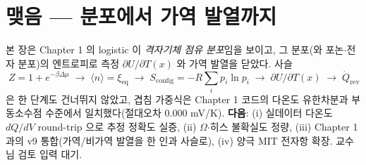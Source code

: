 \documentclass[11pt,a4paper]{article}
\newcommand{\eq}{\mathrm{eq}}
\newcommand{\rev}{\mathrm{rev}}
\newcommand{\cfg}{\mathrm{config}}
\newcommand{\avg}[1]{\langle #1\rangle}
\begin{document}
\section*{맺음 — 분포에서 가역 발열까지}
본 장은 Chapter 1 의 logistic 이 \emph{격자기체 점유 분포}임을 보이고, 그 분포(와 포논$\cdot$전자 분포)의
엔트로피로 측정 $\partial U/\partial T(x)$ 와 가역 발열을 닫았다. 사슬
\[
\boxed{\;Z=1+e^{-\beta\Delta\mu}\;\to\;\avg n=\xi_\eq\;\to\;S_\cfg=-R\textstyle\sum_i p_i\ln p_i\;\to\;\partial U/\partial T(x)\;\to\;\dot Q_\rev\;}
\]
은 한 단계도 건너뛰지 않았고, 겹침 가중식은 Chapter 1 코드의 다온도 유한차분과 부동소수점 수준에서
일치했다(절대오차 $0.000$ mV/K). \textbf{다음}: (i) 실데이터 다온도 $dQ/dV$ round-trip 으로 추정 정확도
실증, (ii) $\Omega$$\cdot$히스 불확실도 정량, (iii) Chapter 1 과의 v9 통합(가역/비가역 발열을 한 인과
사슬로), (iv) 양극 MIT 전자항 확장. 교수님 검토 입력 대기.
\end{document}
